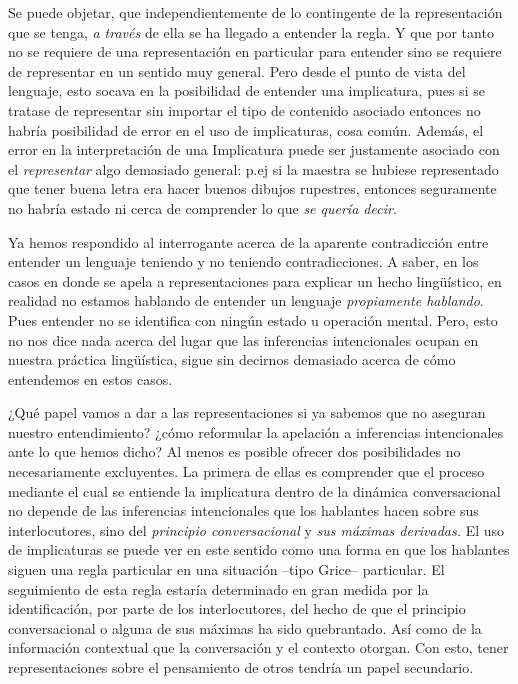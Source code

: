 \documentclass[]{book}
\begin{document}
Se puede objetar, que independientemente de lo contingente de la
representación que se tenga, \emph{a través} de ella se ha llegado a
entender la regla. Y que por tanto no se requiere de una representación
en particular para entender sino se requiere de representar en un
sentido muy general. Pero desde el punto de vista del lenguaje, esto
socava en la posibilidad de entender una implicatura, pues si se tratase
de representar sin importar el tipo de contenido asociado entonces no
habría posibilidad de error en el uso de implicaturas, cosa común.
Además, el error en la interpretación de una Implicatura puede ser
justamente asociado con el \emph{representar} algo demasiado general:
p.ej si la maestra se hubiese representado que tener buena letra era
hacer buenos dibujos rupestres, entonces seguramente no habría estado ni
cerca de comprender lo que \emph{se quería decir}.

Ya hemos respondido al interrogante acerca de la aparente contradicción
entre entender un lenguaje teniendo y no teniendo contradicciones. A
saber, en los casos en donde se apela a representaciones para explicar
un hecho lingüístico, en realidad no estamos hablando de entender un
lenguaje \emph{propiamente hablando}. Pues entender no se identifica con
ningún estado u operación mental. Pero, esto no nos dice nada acerca del
lugar que las inferencias intencionales ocupan en nuestra práctica
lingüística, sigue sin decirnos demasiado acerca de cómo entendemos en
estos casos.

¿Qué papel vamos a dar a las representaciones si ya sabemos que no
aseguran nuestro entendimiento? ¿cómo reformular la apelación a
inferencias intencionales ante lo que hemos dicho? Al menos es posible
ofrecer dos posibilidades no necesariamente excluyentes. La primera de
ellas es comprender que el proceso mediante el cual se entiende la
implicatura dentro de la dinámica conversacional no depende de las
inferencias intencionales que los hablantes hacen sobre sus
interlocutores, sino del \emph{principio conversacional} y \emph{sus
máximas derivadas.} El uso de implicaturas se puede ver en este sentido
como una forma en que los hablantes siguen una regla particular en una
situación --tipo Grice-- particular. El seguimiento de esta regla
estaría determinado en gran medida por la identificación, por parte de
los interlocutores, del hecho de que el principio conversacional o
alguna de sus máximas ha sido quebrantado. Así como de la información
contextual que la conversación y el contexto otorgan. Con esto, tener
representaciones sobre el pensamiento de otros tendría un papel
secundario.
\end{document}

